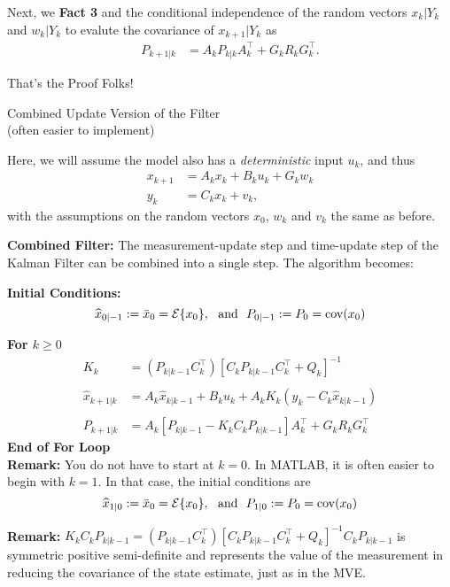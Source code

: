 \documentclass[letterpaper]{article}
\newcommand{\cov}{\mathrm{cov}}
\newcommand{\Expectof}[1]{{\cal E} \{ #1 \}}
\begin{document}
Next, we  \textbf{Fact 3} and the conditional independence of the random vectors $x_k| Y_k$ and $w_k | Y_k$ to evalute
the covariance of $x_{k+1}|Y_k$ as
\begin{align*}
P_{k+1|k} &= A_k P_{k|k} A_k^\top  + G_k R_k G_k^\top.
\end{align*}


\vspace*{1cm}

 {\Large \bf
\begin{center}
 That's the Proof Folks!
\end{center}
}

 \newpage
 {\Large \bf
\begin{center}
 Combined Update Version of the Filter\\
 (often easier to implement)
\end{center}
}

Here, we will assume the model also has a \textit{deterministic} input $u_k$, and thus
\begin{align*}
x_{k+1} &= A_k x_k + B_k u_k + G_k w_k \\
y_k &= C_k x_k + v_k,
\end{align*}
with the assumptions on the random vectors $x_0$, $w_k$ and $v_k$ the same as before.

\textbf{Combined Filter:} The measurement-update step and time-update step of the  Kalman Filter can be combined into a single step. The algorithm becomes:

\textbf{Initial Conditions:}
$$\widehat{x}_{0|-1} :=\bar{x}_0 = \Expectof{x_0},~~\mbox{and}~~P_{0|-1}:=P_0=\cov(x_0)  $$

\textbf{For $k \ge 0$}
\begin{align*}
K_k & = (P_{k|k-1} C_k^\top) \left[ C_k P_{k|k-1} C_k^\top + Q_k \right]^{-1}\\
& \\
\widehat{x}_{k+1|k}&= A_k \widehat{x}_{k|k-1} + B_k u_k + A_k K_k \left( y_k - C_k   \widehat{x}_{k|k-1} \right) \\
& \\
P_{k+1|k} &= A_k \left[ P_{k|k-1} - K_k C_k P_{k|k-1} \right] A_k ^\top + G_k R_k G_k^\top
\end{align*}
\textbf{End of For Loop}\\


\textbf{Remark:} You do not have to start at $k=0$. In MATLAB, it is often easier to begin with $k=1$. In that case, the initial conditions are
$$\widehat{x}_{1|0} :=\bar{x}_0 = \Expectof{x_0},~~\mbox{and}~~P_{1|0}:=P_0=\cov(x_0)  $$

\textbf{Remark:} $ K_k C_k P_{k|k-1} =  (P_{k|k-1} C_k^\top) \left[ C_k P_{k|k-1} C_k^\top + Q_k \right]^{-1}C_k P_{k|k-1}$ is symmetric positive semi-definite and represents the value of the measurement in reducing the covariance of the state estimate, just as in the MVE.
\end{document}
